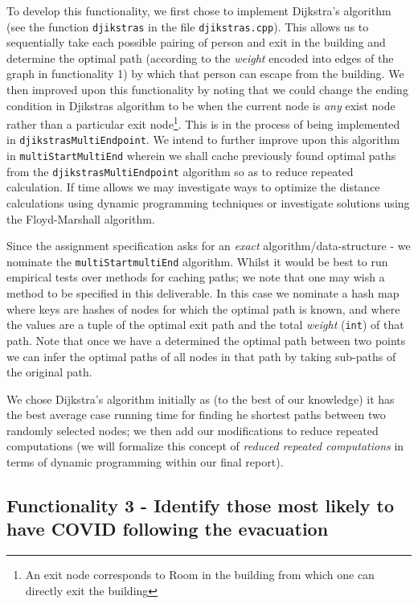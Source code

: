\documentclass{article}
\begin{document}
    To develop this functionality, we first chose to implement Dijkstra's algorithm (see the function \texttt{djikstras} in the file \texttt{djikstras.cpp}). This allows us to sequentially take each possible pairing of person and exit in the building and determine the optimal path (according to the \textit{weight} encoded into edges of the graph in functionality 1) by which that person can escape from the building. We then improved upon this functionality by noting that we could change the ending condition in Djikstras algorithm to be when the current node is \textit{any} exist node rather than a particular exit node\footnote{An exit node corresponds to Room in the building from which one can directly exit the building}. This is in the process of being implemented in \texttt{djikstrasMultiEndpoint}. We intend to further improve upon this algorithm in \texttt{multiStartMultiEnd} wherein we shall cache previously found optimal paths from the \texttt{djikstrasMultiEndpoint} algorithm so as to reduce repeated calculation. If time allows we may investigate ways to optimize the distance calculations using dynamic programming techniques or investigate solutions using the Floyd-Marshall algorithm. 
    
    Since the assignment specification asks for an \textit{exact} algorithm/data-structure - we nominate the \newline\texttt{multiStartmultiEnd} algorithm. Whilst it would be best to run empirical tests over methods for caching paths; we note that one may wish a method to be specified in this deliverable. In this case we nominate a hash map where keys are hashes of nodes for which the optimal path is known, and where the values are a tuple of the optimal exit path and the total \textit{weight} (\texttt{int}) of that path. Note that once we have a determined the optimal path between two points we can infer the optimal paths of all nodes in that path by taking sub-paths of the original path.
    
    We chose Dijkstra's algorithm initially as (to the best of our knowledge) it has the best average case running time for finding he shortest paths between two randomly selected nodes; we then add our modifications to reduce repeated computations (we will formalize this concept of \textit{reduced repeated computations} in terms of dynamic programming within our final report).
    
    
\subsection{Functionality 3 - Identify those most likely to have COVID following the evacuation}
\end{document}
